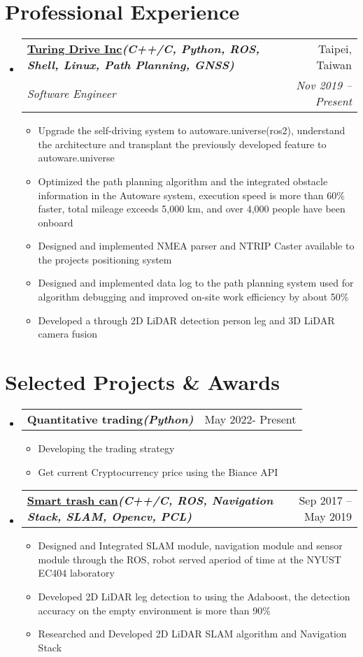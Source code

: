 \documentclass[letterpaper,11pt]{article}
\makeatletter
\newcommand{\resumeItem}[1]{
  \item\small{
    {#1 \vspace{-2pt}}
  }
}
\newcommand{\resumeSubheading}[4]{
  \vspace{-2pt}\item
    \begin{tabular*}{0.97\textwidth}[t]{l@{\extracolsep{\fill}}r}
      \textbf{#1} & #2 \\
      \textit{\small#3} & \textit{\small #4} \\
    \end{tabular*}\vspace{-7pt}
}
\newcommand{\resumeProjectHeading}[2]{
    \item
    \begin{tabular*}{0.97\textwidth}{l@{\extracolsep{\fill}}r}
      \textbf{#1} & #2 \\
    \end{tabular*}\vspace{-7pt}
}
\newcommand{\resumeSubHeadingListStart}{\begin{itemize}[leftmargin=0.15in, label={}]}
\newcommand{\resumeSubHeadingListEnd}{\end{itemize}}
\newcommand{\resumeItemListStart}{\begin{itemize}}
\newcommand{\resumeItemListEnd}{\end{itemize}\vspace{-5pt}}
\makeatother
\begin{document}
\section{\textbf{Professional Experience}}
  \vspace{3pt}
  \resumeSubHeadingListStart

    \resumeSubheading 
      {\href{https://turing-drive.com/zh/home-zh/}{\color{blue}Turing Drive Inc}\emph{\scriptsize{(C++/C, Python, ROS, Shell, Linux, Path Planning, GNSS)}}}{Taipei, Taiwan}
      {Software Engineer}{Nov 2019 -- Present}
      \resumeItemListStart
      \resumeItem{Upgrade the self-driving system to autoware.universe(ros2), understand the architecture and transplant the previously developed feature to autoware.universe}
      \resumeItem{Optimized the path planning algorithm and the integrated obstacle information in the Autoware system, execution speed is more than 60\% faster, total mileage exceeds 5,000 km, and over 4,000 people have been onboard}
      \resumeItem{Designed and implemented NMEA parser and NTRIP Caster available to the projects positioning system}
      \resumeItem{Designed and implemented data log to the path planning system used for algorithm debugging and improved on-site work efficiency by about 50\%}
      \resumeItem{Developed a through 2D LiDAR detection person leg and 3D LiDAR camera fusion}
    \resumeItemListEnd
  \resumeSubHeadingListEnd
  
\section{\textbf{Selected Projects \& Awards}}
  \vspace{3pt}
    \resumeSubHeadingListStart

      \resumeProjectHeading
        {Quantitative trading\emph{\scriptsize{(Python)}}}{May 2022- Present}
        \resumeItemListStart
          \resumeItem{Developing the trading strategy}
          \resumeItem{Get current Cryptocurrency price using the Biance API}
        \resumeItemListEnd

      \resumeProjectHeading
        {\href{https://drive.google.com/file/d/1FCTHbe_6uXDAoiZOx13j0Z9KNvcpPl73/view?usp=sharing}{\color{blue}Smart trash can}\emph{\scriptsize{(C++/C, ROS, Navigation Stack, SLAM, Opencv, PCL)}}}{Sep 2017 -- May 2019}
          \resumeItemListStart
            \resumeItem{Designed and Integrated SLAM module, navigation module and sensor module through the ROS, robot served aperiod of time at the NYUST EC404 laboratory}
            \resumeItem{Developed 2D LiDAR leg detection to using the Adaboost, the detection accuracy on the empty environment is more than 90\%}
            \resumeItem{Researched and Developed 2D LiDAR SLAM algorithm and Navigation Stack}
          \resumeItemListEnd
    \resumeSubHeadingListEnd

%

\end{document}
